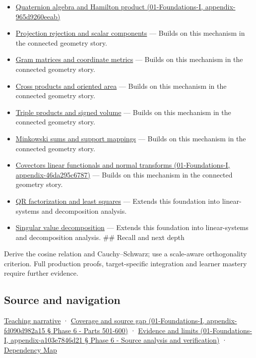 \begin{itemize}
\item
  \href{}{Quaternion algebra and Hamilton product (01-Foundations-I, appendix-965d9260eeab)}
\item
  \hyperref[appendix-505a502c372a]{Projection rejection and scalar components} --- Builds on this mechanism in the connected geometry story.
\item
  \hyperref[appendix-3b863809f82a]{Gram matrices and coordinate metrics} --- Builds on this mechanism in the connected geometry story.
\item
  \hyperref[appendix-2391db8052b1]{Cross products and oriented area} --- Builds on this mechanism in the connected geometry story.
\item
  \hyperref[appendix-5caa058bd9c7]{Triple products and signed volume} --- Builds on this mechanism in the connected geometry story.
\item
  \hyperref[appendix-215ac7099a82]{Minkowski sums and support mappings} --- Builds on this mechanism in the connected geometry story.
\item
  \href{}{Covectors linear functionals and normal transforms (01-Foundations-I, appendix-46da295c6787)} --- Builds on this mechanism in the connected geometry story.
\item
  \hyperref[appendix-c3421e6b4f2c]{QR factorization and least squares} --- Extends this foundation into linear-systems and decomposition analysis.
\item
  \hyperref[appendix-1fad5e7f36fa]{Singular value decomposition} --- Extends this foundation into linear-systems and decomposition analysis. \#\# Recall and next depth
\end{itemize}

Derive the cosine relation and Cauchy--Schwarz; use a scale-aware orthogonality criterion. Full production proofs, target-specific integration and learner mastery require further evidence.

\subsection{Source and navigation}\label{source-and-navigation}

\href{Continuous\%20Notes/Computing\%20Foundations\%20-\%20From\%20Bits\%20to\%20C++\%20and\%20Systems\%20APIs\#The\%20dot\%20product\%20turns\%20two\%20movements\%20into\%20a\%20measurement}{Teaching narrative} · \href{}{Coverage and source gap (01-Foundations-I, appendix-fd090d982a15 § Phase 6 - Parts 501-600)} · \href{}{Evidence and limits (01-Foundations-I, appendix-a103e7846d21 § Phase 6 - Source analysis and verification)} · \hyperref[appendix-4ad47bdd269a]{Dependency Map}

